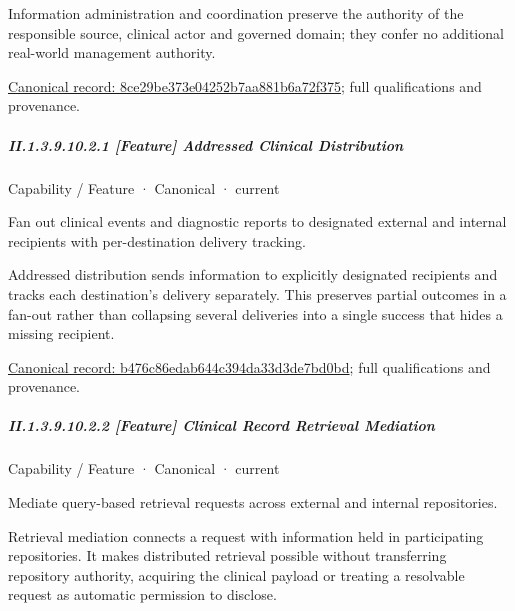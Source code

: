 Information administration and coordination preserve the authority of the responsible source, clinical actor and governed domain; they confer no additional real-world management authority.


{\footnotesize \href{../../../../../../../continuum/strategy/capability/8ce29be373e04252b7aa881b6a72f375.md}{Canonical record: 8ce29be373e04252b7aa881b6a72f375}; full qualifications and provenance.}\par
\subparagraph*{II.1.3.9.10.2.1 [Feature] Addressed Clinical Distribution}
\label{navigation:II.1.3.9.10.2.1}

\label{element:b476c86edab644c394da33d3de7bd0bd}
{\small Capability / Feature · Canonical · current}\par

Fan out clinical events and diagnostic reports to designated external and internal recipients with per-destination delivery tracking.



Addressed distribution sends information to explicitly designated recipients and tracks each destination's delivery separately. This preserves partial outcomes in a fan-out rather than collapsing several deliveries into a single success that hides a missing recipient.


{\footnotesize \href{../../../../../../../continuum/strategy/capability/feature/b476c86edab644c394da33d3de7bd0bd.md}{Canonical record: b476c86edab644c394da33d3de7bd0bd}; full qualifications and provenance.}\par
\subparagraph*{II.1.3.9.10.2.2 [Feature] Clinical Record Retrieval Mediation}
\label{navigation:II.1.3.9.10.2.2}

\label{element:6f4a9c8f7916488bb0dd838ccccb1df4}
{\small Capability / Feature · Canonical · current}\par

Mediate query-based retrieval requests across external and internal repositories.



Retrieval mediation connects a request with information held in participating repositories. It makes distributed retrieval possible without transferring repository authority, acquiring the clinical payload or treating a resolvable request as automatic permission to disclose.


